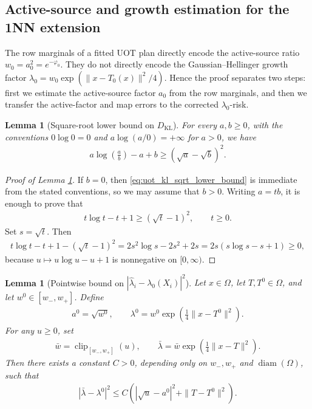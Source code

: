 \documentclass[11pt,reqno]{amsart}
\newtheorem{lemma}[theorem]{Lemma}
\theoremstyle{definition}
\newcommand{\KL}{\mathrm{KL}}
\renewcommand{\hat}{\widehat}
\DeclareMathOperator{\clip}{clip}
\begin{document}
\subsection{Active-source and growth estimation for the 1NN extension}

The row marginals of a fitted UOT plan directly encode the active-source ratio
\(w_0=a_0^2=e^{-\varphi_0}\). They do not directly encode the Gaussian--Hellinger growth factor
\(
\lambda_0=w_0\exp(\|x-T_0(x)\|^2/4)
\).
Hence the proof separates two steps: first we estimate the active-source factor \(a_0\) from the row marginals, and then we transfer the active-factor and map errors to the corrected \(\lambda_0\)-risk.

\begin{lemma}[Square-root lower bound on $D_\KL$]
\label{lem:uot_kl_sqrt_lower_bound}
For every $a,b\ge 0$, with the conventions $0\log 0 = 0$ and $a\log(a/0)=+\infty$ for $a>0$, we have
\begin{align}
\label{eq:uot_kl_sqrt_lower_bound}
    a\log\left(\frac{a}{b}\right)-a+b
    \ge
    \left(\sqrt{a}-\sqrt{b}\right)^2.
\end{align}
\end{lemma}

\begin{proof}[Proof of Lemma \ref{lem:uot_kl_sqrt_lower_bound}]
If $b=0$, then \eqref{eq:uot_kl_sqrt_lower_bound} is immediate from the stated conventions, so we may assume that $b>0$.
Writing $a=tb$, it is enough to prove that
\begin{align*}
    t\log t - t + 1 \ge (\sqrt{t}-1)^2,
    \qquad t\ge 0.
\end{align*}
Set $s=\sqrt{t}$. Then
\begin{align*}
    t\log t-t+1-(\sqrt t-1)^2
    =2s^2\log s-2s^2+2s
    =2s(s\log s-s+1)\ge0,
\end{align*}
because $u\mapsto u\log u-u+1$ is nonnegative on $[0,\infty)$.
\end{proof}

\begin{lemma}[Pointwise bound on $|\hat\lambda_i-\lambda_0(X_i)|^2$]
\label{lem:discrete_gh_growth_transfer}
Let $x\in\Omega$, let $T,T^0\in\Omega$, and let $w^0\in[w_-,w_+]$. Define
\begin{align*}
    a^0=\sqrt{w^0},
    \qquad
    \lambda^0=w^0\exp\left(\frac14\|x-T^0\|^2\right).
\end{align*}
For any $u\ge0$, set
\begin{align*}
    \bar w=\clip_{[w_-,w_+]}(u),
    \qquad
    \bar\lambda=\bar w\exp\left(\frac14\|x-T\|^2\right).
\end{align*}
Then there exists a constant $C>0$, depending only on $w_-,w_+$ and $\operatorname{diam}(\Omega)$, such that
\begin{align}
\label{eq:discrete_gh_growth_transfer}
    |\bar\lambda-\lambda^0|^2
    \le
    C\left(|\sqrt{u}-a^0|^2+\|T-T^0\|^2\right).
\end{align}
\end{lemma}
\end{document}
